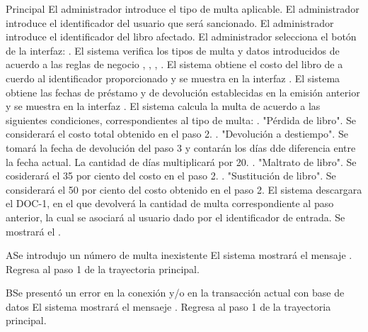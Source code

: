 \begin{UCtrayectoria}{Principal}
	\UCpaso[\UCactor] El administrador introduce el tipo de multa aplicable.
	\UCpaso[\UCactor] El administrador introduce el identificador del usuario que será sancionado.
	\UCpaso[\UCactor] El administrador introduce el identificador del libro afectado.
	\UCpaso[\UCactor] El administrador selecciona el botón  de la interfaz: .
	\UCpaso[\UCsist] El sistema verifica los tipos de multa y datos introducidos de acuerdo a las reglas de negocio , , , .
	\UCpaso[\UCsist] El sistema obtiene el costo del libro de a cuerdo al identificador proporcionado y se muestra en la interfaz . 
	\UCpaso[\UCsist] El sistema obtiene las fechas de préstamo y de devolución establecidas en la emisión anterior y se muestra en la interfaz . 
	\UCpaso[\UCsist] El sistema calcula la multa de acuerdo a las siguientes condiciones, correspondientes al tipo de multa: . "Pérdida de libro". Se considerará el costo total obtenido en el paso 2. . "Devolución a destiempo". Se tomará la fecha de devolución del paso 3 y contarán los días dde diferencia entre la fecha actual. La cantidad de días multiplicará por 20. . "Maltrato de libro". Se cosiderará el 35 por ciento del costo en el paso 2. . "Sustitución de libro". Se considerará el 50 por ciento del costo obtenido en el paso 2.
	\UCpaso[\UCsist] El sistema descargara el DOC-1, en el que devolverá la cantidad de multa correspondiente al paso anterior, la cual se asociará al usuario dado por el identificador de entrada.  
	\UCpaso[\UCsist] Se mostrará el .
\end{UCtrayectoria}
\begin{UCtrayectoriaA}{A}{Se introdujo un número de multa inexistente}	
			\UCpaso[\UCsist] El sistema mostrará el mensaje .
			\UCpaso[\UCsist] Regresa al paso 1 de la trayectoria principal. 
\end{UCtrayectoriaA}
\begin{UCtrayectoriaA}{B}{Se presentó un error en la conexión y/o en la transacción actual con base de datos}
			\UCpaso[\UCsist] El sistema mostrará el mensaeje .
			\UCpaso[\UCsist] Regresa al paso 1 de la trayectoria principal.
\end{UCtrayectoriaA}